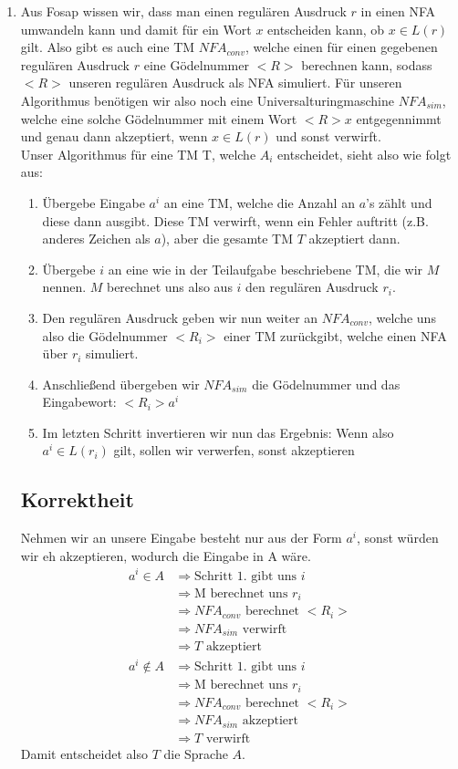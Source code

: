 \documentclass[a4paper,11pt]{scrartcl}
\begin{document}
\begin{enumerate}[label=\alph*)]
	\item	Aus Fosap wissen wir, dass man einen regulären Ausdruck $r$ in einen NFA umwandeln kann und damit für ein Wort $x$ entscheiden kann, ob $x \in L(r)$ gilt. Also gibt es auch eine TM $NFA_{conv}$, welche einen für einen gegebenen regulären Ausdruck $r$ eine Gödelnummer $<R>$ berechnen kann, sodass $<R>$ unseren regulären Ausdruck als NFA simuliert. Für unseren Algorithmus benötigen wir also noch eine Universalturingmaschine $NFA_{sim}$, welche eine solche Gödelnummer mit einem Wort $<R>x$ entgegennimmt und genau dann akzeptiert, wenn $x\in L(r)$ und sonst verwirft.\\
			Unser Algorithmus für eine TM T, welche $A_i$ entscheidet, sieht also wie folgt aus:
			\begin{enumerate}[label=\arabic*.]
			\item	Übergebe Eingabe $a^i$ an eine TM, welche die Anzahl an $a$'s zählt und diese dann ausgibt. Diese TM verwirft, wenn ein Fehler auftritt (z.B. anderes Zeichen als $a$), aber die gesamte TM $T$ akzeptiert dann.
			\item	Übergebe $i$ an eine wie in der Teilaufgabe beschriebene TM, die wir $M$ nennen. $M$ berechnet uns also aus $i$ den regulären Ausdruck $r_i$.
			\item	Den regulären Ausdruck geben wir nun weiter an $NFA_{conv}$, welche uns also die Gödelnummer $<R_i>$ einer TM zurückgibt, welche einen NFA über $r_i$ simuliert.
			\item	Anschließend übergeben wir $NFA_{sim}$ die Gödelnummer und das Eingabewort: $<R_i>a^i$
			\item	Im letzten Schritt invertieren wir nun das Ergebnis: Wenn also $a^i \in L(r_i)$ gilt, sollen wir verwerfen, sonst akzeptieren
			\end{enumerate}
	\subsection*{Korrektheit}
	Nehmen wir an unsere Eingabe besteht nur aus der Form $a^i$, sonst würden wir eh akzeptieren, wodurch die Eingabe in A wäre.
	\begin{align*}
	a^i \in A	& \Rightarrow \text{Schritt 1. gibt uns } i \\
				& \Rightarrow \text{M berechnet uns } r_i \\
				& \Rightarrow NFA_{conv} \text{ berechnet } <R_i> \\
				& \Rightarrow NFA_{sim} \text{ verwirft} \\
				& \Rightarrow T \text{ akzeptiert}
	\end{align*}
	\begin{align*}
	a^i \not\in A	& \Rightarrow \text{Schritt 1. gibt uns } i \\
					& \Rightarrow \text{M berechnet uns } r_i \\
					& \Rightarrow NFA_{conv} \text{ berechnet } <R_i> \\
					& \Rightarrow NFA_{sim} \text{ akzeptiert} \\
					& \Rightarrow T \text{ verwirft}
	\end{align*}
	Damit entscheidet also $T$ die Sprache $A$.
	\end{enumerate}
\end{document}
